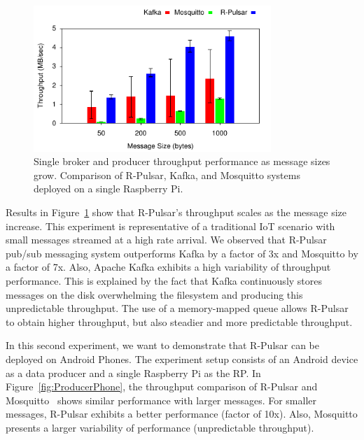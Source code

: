 \begin{figure}[h]
  \centering
  \includegraphics[width=0.8\textwidth]{Results/ProducerBar}
    \caption{Single broker and producer throughput performance as message sizes grow. Comparison of R-Pulsar, Kafka, and Mosquitto systems deployed on a single Raspberry Pi.}
  \label{fig:ProducerBar}
\end{figure}

Results in Figure~\ref{fig:ProducerBar} show that R-Pulsar's throughput scales as the message size increase. This experiment is representative of a traditional IoT scenario with small messages streamed at a high rate arrival.
We observed that R-Pulsar pub/sub messaging system outperforms Kafka by a factor of 3x and Mosquitto by a factor of 7x. Also, Apache Kafka exhibits a high variability of throughput performance. 
This is explained by the fact that Kafka continuously stores messages on the disk overwhelming the filesystem and producing this unpredictable throughput.
The use of a memory-mapped queue allows R-Pulsar to obtain higher throughput, but also steadier and more predictable throughput.

In this second experiment, we want to demonstrate that R-Pulsar can be deployed on  Android Phones.  
The experiment setup consists of an Android device as a data producer and a single Raspberry Pi as the RP.
In Figure~\ref{fig:ProducerPhone}, the throughput comparison of R-Pulsar and Mosquitto~\cite{mosquitto} shows similar performance with larger messages. For smaller messages, R-Pulsar exhibits a better performance (factor of 10x). Also, Mosquitto presents a larger variability of performance (unpredictable throughput).

